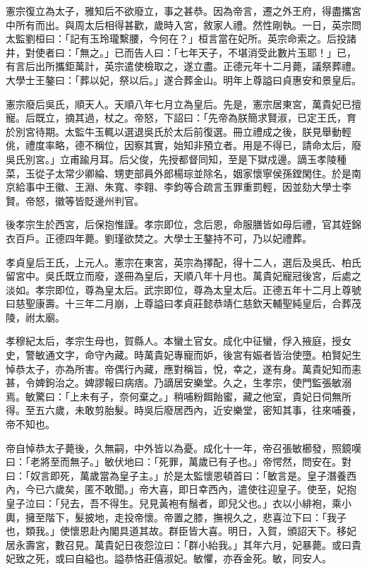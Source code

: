 憲宗復立為太子，雅知后不欲廢立，事之甚恭。因為帝言，遷之外王府，得盡攜宮中所有而出。與周太后相得甚歡，歲時入宮，敘家人禮。然性剛執。一日，英宗問太監劉桓曰：「記有玉玲瓏繫腰，今何在？」桓言當在妃所。英宗命索之。后投諸井，對使者曰：「無之。」已而告人曰：「七年天子，不堪消受此數片玉耶！」已，有言后出所攜鉅萬計，英宗遣使檢取之，遂立盡。正德元年十二月薨，議祭葬禮。大學士王鏊曰：「葬以妃，祭以后。」遂合葬金山。明年上尊謚曰貞惠安和景皇后。

憲宗廢后吳氏，順天人。天順八年七月立為皇后。先是，憲宗居東宮，萬貴妃已擅寵。后既立，摘其過，杖之。帝怒，下詔曰：「先帝為朕簡求賢淑，已定王氏，育於別宮待期。太監牛玉輒以選退吳氏於太后前復選。冊立禮成之後，朕見舉動輕佻，禮度率略，德不稱位，因察其實，始知非預立者。用是不得已，請命太后，廢吳氏別宮。」立甫踰月耳。后父俊，先授都督同知，至是下獄戍邊。謫玉孝陵種菜，玉從子太常少卿綸、甥吏部員外郎楊琮並除名，姻家懷寧侯孫鏜閑住。於是南京給事中王徽、王淵、朱寬、李翱、李鈞等合疏言玉罪重罰輕，因並劾大學士李賢。帝怒，徽等皆貶邊州判官。

後孝宗生於西宮，后保抱惟謹。孝宗即位，念后恩，命服膳皆如母后禮，官其姪錦衣百戶。正德四年薨。劉瑾欲焚之。大學士王鏊持不可，乃以妃禮葬。

孝貞皇后王氏，上元人。憲宗在東宮，英宗為擇配，得十二人，選后及吳氏、柏氏留宮中。吳氏既立而廢，遂冊為皇后，天順八年十月也。萬貴妃寵冠後宮，后處之淡如。孝宗即位，尊為皇太后。武宗即位，尊為太皇太后。正德五年十二月上尊號曰慈聖康壽。十三年二月崩，上尊謚曰孝貞莊懿恭靖仁慈欽天輔聖純皇后，合葬茂陵，祔太廟。

孝穆紀太后，孝宗生母也，賀縣人。本蠻土官女。成化中征蠻，俘入掖庭，授女史，警敏通文字，命守內藏。時萬貴妃專寵而妒，後宮有娠者皆治使墮。柏賢妃生悼恭太子，亦為所害。帝偶行內藏，應對稱旨，悅，幸之，遂有身。萬貴妃知而恚甚，令婢鉤治之。婢謬報曰病痞。乃謫居安樂堂。久之，生孝宗，使門監張敏溺焉。敏驚曰：「上未有子，奈何棄之。」稍哺粉餌飴蜜，藏之他室，貴妃日伺無所得。至五六歲，未敢剪胎髮。時吳后廢居西內，近安樂堂，密知其事，往來哺養，帝不知也。

帝自悼恭太子薨後，久無嗣，中外皆以為憂。成化十一年，帝召張敏櫛發，照鏡嘆曰：「老將至而無子。」敏伏地曰：「死罪，萬歲已有子也。」帝愕然，問安在。對曰：「奴言即死，萬歲當為皇子主。」於是太監懷恩頓首曰：「敏言是。皇子潛養西內，今已六歲矣，匿不敢聞。」帝大喜，即日幸西內，遣使往迎皇子。使至，妃抱皇子泣曰：「兒去，吾不得生。兒見黃袍有鬚者，即兒父也。」衣以小緋袍，乘小輿，擁至階下，髮披地，走投帝懷。帝置之膝，撫視久之，悲喜泣下曰：「我子也，類我。」使懷恩赴內閣具道其故。群臣皆大喜。明日，入賀，頒詔天下。移妃居永壽宮，數召見。萬貴妃日夜怨泣曰：「群小紿我。」其年六月，妃暴薨。或曰貴妃致之死，或曰自縊也。謚恭恪莊僖淑妃。敏懼，亦吞金死。敏，同安人。

